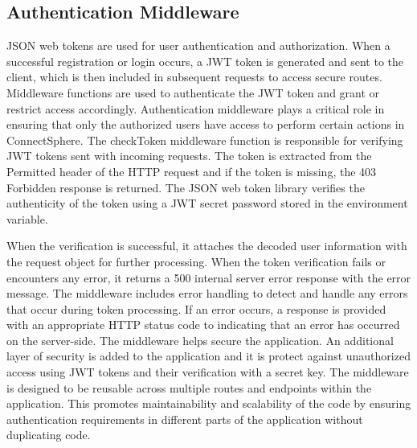 \subsection{Authentication Middleware}
JSON web tokens are used for user authentication and authorization. When a successful registration or login occurs, a
JWT token is generated and sent to the client, which is then included in subsequent requests to access secure routes. Middleware functions are used to authenticate the JWT token and grant or restrict access accordingly. Authentication middleware plays a critical role in ensuring that only the authorized users have access to perform certain actions in ConnectSphere. The checkToken middleware function is responsible for verifying JWT tokens sent with incoming requests. The token is extracted from the Permitted header of the HTTP request and if the token is missing, the 403 Forbidden response is returned. The JSON web token library verifies the authenticity of the token using a JWT secret password stored in the environment variable.

When the verification is successful, it attaches the decoded user information with the request object for further processing. When the token verification fails or encounters any error, it returns a 500 internal server error response with the error message. The middleware includes error handling to detect and handle any errors that occur during token processing. If an error occurs, a response is provided with an appropriate HTTP status code to indicating that an error has occurred on the server-side. The middleware helps secure the application. An additional layer of security is added to the application and it is protect against unauthorized access using JWT tokens and their verification with a secret key. The middleware is designed to be reusable across multiple routes and endpoints within the application. This promotes maintainability and scalability of the code by ensuring authentication requirements in different parts of the application without duplicating code.

